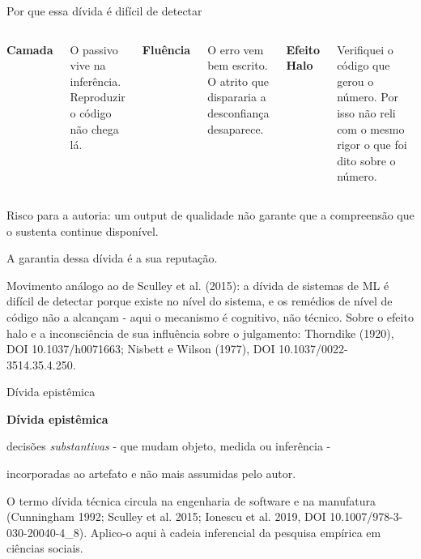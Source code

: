 \documentclass[
  12pt,
  ignorenonframetext,
  aspectratio=169]{beamer}
\begin{document}
\begin{frame}{Por que essa dívida é difícil de detectar}
\protect{}\label{por-que-essa-duxedvida-uxe9-difuxedcil-de-detectar}
\begin{columns}[T,onlytextwidth]
\centering
{\color{orange}\Large\textbf{Camada}}

\vspace{0.2cm}
\normalsize O passivo vive na inferência. Reproduzir o código não chega lá.

\centering
{\color{orange}\Large\textbf{Fluência}}

\vspace{0.2cm}
\normalsize O erro vem bem escrito. O atrito que dispararia a desconfiança desaparece.

\centering
{\color{orange}\Large\textbf{Efeito Halo}}

\vspace{0.2cm}
\normalsize Verifiquei o código que gerou o número. Por isso não reli com o mesmo rigor o que foi dito sobre o número.
\end{columns}

\vspace{0.45cm}
\begin{center}
\normalsize Risco para a autoria: um output de qualidade não garante que a compreensão que o sustenta continue disponível.

\vspace{0.25cm}
\large A garantia dessa dívida é a sua reputação.
\end{center}

\vfill{\tiny\color{muted}Movimento análogo ao de Sculley et al. (2015): a dívida de sistemas de ML é difícil de detectar porque existe no nível do sistema, e os remédios de nível de código não a alcançam - aqui o mecanismo é cognitivo, não técnico. Sobre o efeito halo e a inconsciência de sua influência sobre o julgamento: Thorndike (1920), DOI 10.1037/h0071663; Nisbett e Wilson (1977), DOI 10.1037/0022-3514.35.4.250.}
\end{frame}

\begin{frame}{Dívida epistêmica}
\protect{}\label{duxedvida-epistuxeamica}
\begin{center}
\vspace{0.5cm}
{\color{orange}\Huge\textbf{Dívida epistêmica}}

\vspace{0.45cm}
\Large decisões \textit{substantivas} - que mudam objeto, medida ou inferência -

\vspace{0.15cm}
\Large incorporadas ao artefato e não mais assumidas pelo autor.

\vspace{0.6cm}
\end{center}

\vfill{\tiny\color{muted}O termo dívida técnica circula na engenharia de software e na manufatura (Cunningham 1992; Sculley et al. 2015; Ionescu et al. 2019, DOI 10.1007/978-3-030-20040-4\_8). Aplico-o aqui à cadeia inferencial da pesquisa empírica em ciências sociais.}
\end{frame}
\end{document}
